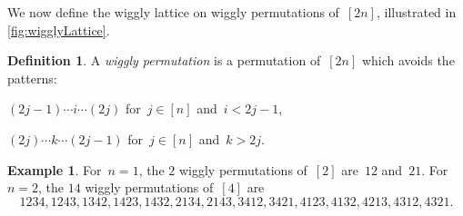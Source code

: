 \documentclass[submission]{FPSAC2025}
\theoremstyle{definition}
\newtheorem{definition}[theorem]{Definition}
\newtheorem{example}[theorem]{Example}
\newcommand{\darkblue}{\color{darkblue}} %
\newcommand{\defn}[1]{\textsl{\darkblue #1}} %
\begin{document}
We now define the wiggly lattice on wiggly permutations of~$[2n]$, illustrated in \cref{fig:wigglyLattice}.

\begin{definition}
\label{def:wigglyPermutation}
A \defn{wiggly permutation} is a permutation of~$[2n]$ which avoids the patterns:
\begin{compactitem}
\item $(2j-1) \cdots i \cdots (2j)$ for~$j \in [n]$ and~$i < 2j-1$,
\item $(2j) \cdots k \cdots (2j-1)$ for~$j \in [n]$ and~$k > 2j$.
\end{compactitem}
\end{definition}

\begin{example}
\label{exm:allSmallWigglyPermutations}
For~$n = 1$, the $2$ wiggly permutations of~$[2]$ are~$12$ and~$21$.
For~$n = 2$, the $14$ wiggly permutations of~$[4]$ are
\vspace{-.1cm}
\[
1234, 1243, 1342, 1423, 1432, 2134, 2143, 3412, 3421, 4123, 4132, 4213, 4312, 4321.
\]
\end{example}
\end{document}
